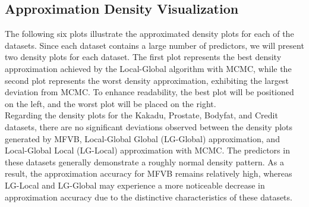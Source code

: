 \subsection{Approximation Density Visualization}
The following six plots illustrate the approximated density plots for each of the datasets. Since each dataset contains a large number of predictors, we will present two density plots for each dataset. The first plot represents the best density approximation achieved by the Local-Global algorithm with MCMC, while the second plot represents the worst density approximation, exhibiting the largest deviation from MCMC. To enhance readability, the best plot will be positioned on the left, and the worst plot will be placed on the right.\\
Regarding the density plots for the Kakadu, Prostate, Bodyfat, and Credit datasets, there are no significant deviations observed between the density plots generated by MFVB, Local-Global Global (LG-Global) approximation, and Local-Global Local (LG-Local) approximation with MCMC. The predictors in these datasets generally demonstrate a roughly normal density pattern. As a result, the approximation accuracy for MFVB remains relatively high, whereas LG-Local and LG-Global may experience a more noticeable decrease in approximation accuracy due to the distinctive characteristics of these datasets.\\
\newpage
